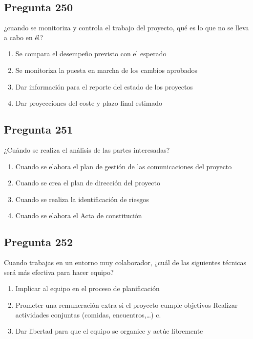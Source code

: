 \documentclass[11pt,a4paper]{article}
\begin{document}
\subsection*{Pregunta 250}
¿cuando se monitoriza y controla el trabajo del proyecto, qué es lo que no se lleva a cabo en él?

\begin{enumerate}[label=\alph*)]
  \item Se compara el desempeño previsto con el esperado
  \item Se monitoriza la puesta en marcha de los cambios aprobados
  \item Dar información para el reporte del estado de los proyectos
  \item Dar proyecciones del coste y plazo final estimado
\end{enumerate}

\subsection*{Pregunta 251}
¿Cuándo se realiza el análisis de las partes interesadas?

\begin{enumerate}[label=\alph*)]
  \item Cuando se elabora el plan de gestión de las comunicaciones del proyecto
  \item Cuando se crea el plan de dirección del proyecto
  \item Cuando se realiza la identificación de riesgos
  \item Cuando se elabora el Acta de constitución
\end{enumerate}

\subsection*{Pregunta 252}
Cuando trabajas en un entorno muy colaborador, ¿cuál de las siguientes técnicas será más efectiva para hacer equipo?

\begin{enumerate}[label=\alph*)]
  \item Implicar al equipo en el proceso de planificación
  \item Prometer una remuneración extra si el proyecto cumple objetivos Realizar actividades conjuntas (comidas, encuentros,…) c.
  \item Dar libertad para que el equipo se organice y actúe libremente
\end{enumerate}
\end{document}
